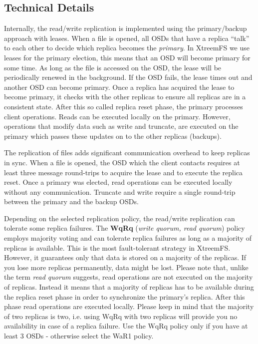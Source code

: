 \documentclass[a4paper,10pt]{book}
\begin{document}
\subsection{Technical Details}
Internally, the read/write replication is implemented using the primary/backup approach with leases. When a file is opened, all OSDs that have a replica ``talk'' to each other to decide which replica becomes the \textit{primary}. In XtreemFS we use leases for the primary election, this means that an OSD will become primary for some time. As long as the file is accessed on the OSD, the lease will be periodically renewed in the background. If the OSD fails, the lease times out and another OSD can become primary.
Once a replica has acquired the lease to become primary, it checks with the other replicas to ensure all replicas are in a consistent state. After this so called replica reset phase, the primary processes client operations.
Reads can be executed locally on the primary. However, operations that modify data such as write and truncate, are executed on the primary which passes these updates on to the other replicas (backups).

The replication of files adds significant communication overhead to keep replicas in sync. When a file is opened, the OSD which the client contacts requires at least three message round-trips to acquire the lease and to execute the replica reset. Once a primary was elected, read operations can be executed locally without any communication. Truncate and write require a single round-trip between the primary and the backup OSDs.

Depending on the selected replication policy, the read/write replication can tolerate some replica failures. The \textbf{WqRq} (\textit{write quorum, read quorum}) policy employs majority voting and can tolerate replica failures as long as a majority of replicas is available. This is the most fault-tolerant strategy in XtreemFS. However, it guarantees only that data is stored on a majority of the replicas. If you lose more replicas permanently, data might be lost. Please note that, unlike the term \textit{read quorum} suggests, read operations are not executed on the majority of replicas. Instead it means that a majority of replicas has to be available during the replica reset phase in order to synchronize the primary's replica. After this phase read operations are executed locally. Please keep in mind that the majority of two replicas is two, i.e. using WqRq with two replicas will provide you no availability in case of a replica failure. Use the WqRq policy only if you have at least 3 OSDs - otherwise select the WaR1 policy.
\end{document}
